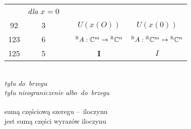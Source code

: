 \documentclass[a4paper,11pt]{article}
\begin{document}
\begin{center}
\begin{tabular}{|c|c|c|c|c|}
           & \textit{dla} $x = 0$ \\
    92  &  3 & & $U( x( O ) )$ & $U( x( 0 ) )$ \\[0.3em]
    123 &  6 & & $^{ \mathbb{R} }A : \mathbb{C}^{ m } \to { }^{ \mathbb{R} } \mathbb{C}^{ n }$
           & ${ }^{ \mathbb{R} }A : { }^{ \mathbb{R} } \mathbb{C}^{ m }
             \to { }^{ \mathbb{R} } \mathbb{C}^{ n }$ \\
    125 &  5 & & $\mathbf{I}$ & $I$ \\
    \hline
  \end{tabular}

\end{center}

\vspace{\VerSpaceSix}


\noindent
{} \\
\Jest  \textit{tyłu do~brzegu} \\
\Powin \textit{tyłu nieograniczenie albo~do~brzegu} \\
 \\
\Jest  sumą częściową szeregu --~iloczynu \\
\Powin jest sumą części wyrazów iloczynu \\














\vspace{0em}


\end{document}
